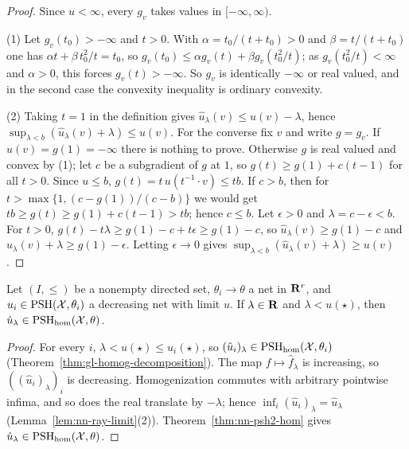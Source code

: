 \begin{proof}
Since $u<\infty$, every $g_v$ takes values in $[-\infty,\infty)$.

(1) Let $g_v(t_0)>-\infty$ and $t>0$. With $\alpha=t_0/(t+t_0)>0$ and $\beta=t/(t+t_0)$ one has $\alpha t+\beta\,t_0^2/t=t_0$, so
$g_v(t_0)\le\alpha g_v(t)+\beta g_v(t_0^2/t)$; as $g_v(t_0^2/t)<\infty$ and $\alpha>0$, this forces $g_v(t)>-\infty$. So $g_v$ is identically $-\infty$ or real
valued, and in the second case the convexity inequality is ordinary convexity.

(2) Taking $t=1$ in the definition gives $\hat u_\lambda(v)\le u(v)-\lambda$, hence $\sup_{\lambda<b}(\hat u_\lambda(v)+\lambda)\le u(v)$. For the converse fix $v$
and write $g=g_v$. If $u(v)=g(1)=-\infty$ there is nothing to prove. Otherwise $g$ is real valued and convex by (1); let $c$ be a subgradient of $g$ at $1$, so
$g(t)\ge g(1)+c(t-1)$ for all $t>0$. Since $u\le b$, $g(t)=t\,u(t^{-1}\cdot v)\le tb$. If $c>b$, then for $t>\max\{1,(c-g(1))/(c-b)\}$ we would get
$tb\ge g(t)\ge g(1)+c(t-1)>tb$; hence $c\le b$. Let $\epsilon>0$ and $\lambda=c-\epsilon<b$. For $t>0$,
$g(t)-t\lambda\ge g(1)-c+t\epsilon\ge g(1)-c$, so $\hat u_\lambda(v)\ge g(1)-c$ and $\hat u_\lambda(v)+\lambda\ge g(1)-\epsilon$. Letting $\epsilon\to0$ gives
$\sup_{\lambda<b}(\hat u_\lambda(v)+\lambda)\ge u(v)$.
\end{proof}

\begin{lemma}\label{lem:hm-limit-slices}
\leanok
{}
Let $(I,\le)$ be a nonempty directed set, $\theta_i\to\theta$ a net in $\mathbf{R}^r$, and $u_i\in\operatorname{PSH}(\mathcal X,\theta_i)$ a decreasing net with limit $u$. If
$\lambda\in\mathbf{R}$ and $\lambda<u(\star)$, then $\hat u_\lambda\in\operatorname{PSH}_{\mathrm{hom}}(\mathcal X,\theta)$.
\end{lemma}

\begin{proof}
For every $i$, $\lambda<u(\star)\le u_i(\star)$, so $(\hat u_i)_\lambda\in\operatorname{PSH}_{\mathrm{hom}}(\mathcal X,\theta_i)$ (Theorem~\ref{thm:gl-homog-decomposition}). The map
$f\mapsto\hat f_\lambda$ is increasing, so $((\hat u_i)_\lambda)_i$ is decreasing. Homogenization commutes with arbitrary pointwise infima, and so does the real
translate by $-\lambda$; hence $\inf_i(\hat u_i)_\lambda=\hat u_\lambda$ (Lemma~\ref{lem:nn-ray-limit}(2)). Theorem~\ref{thm:nn-psh2-hom} gives
$\hat u_\lambda\in\operatorname{PSH}_{\mathrm{hom}}(\mathcal X,\theta)$.
\end{proof}

